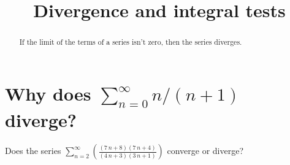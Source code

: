 \documentclass{ximera}
\title{Divergence and integral tests}
\begin{document}
\begin{abstract}
  If the limit of the terms of a series isn't zero, then the series diverges.
\end{abstract}

\maketitle

\section{Why does $\displaystyle\sum_{n=0}^\infty n/(n+1)$ diverge?}


\begin{question}
  Does the series \(\displaystyle\sum_{n=2}^\infty \left( \displaystyle\frac{ { \left(7 \, n + 8\right) } { \left(7 \, n + 4\right) } }{ {\left(4 \, n + 3\right)} {\left(3 \, n + 1\right)} } \right)\) converge or diverge?


\end{question}
\end{document}
